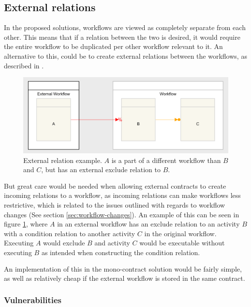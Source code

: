 \documentclass{article}
\begin{document}
		\subsection{External relations}
		\label{sec:external-relations}
		In the proposed solutions, workflows are viewed as completely separate from each other. 
		This means that if a relation between the two is desired, it would require the entire workflow to be duplicated per other workflow relevant to it.
		An alternative to this, could be to create external relations between the workflows, as described in \cite{distributed-workflows}.

		\begin{figure}[!ht]
			\centering
			\includegraphics[scale=0.3]{figures/external-relations-example.png}
		 	\caption[External relation example]
		 	{External relation example. $A$ is a part of a different workflow than $B$ and $C$, but has an external exclude relation to $B$.}
		 	\label{fig:external-relations-example}
		\end{figure}


		But great care would be needed when allowing external contracts to create incoming relations to a workflow, as incoming relations can make workflows less restrictive, which is related to the issues outlined with regards to workflow changes (See section \ref{sec:workflow-changes}). 
		An example of this can be seen in figure \ref{fig:external-relations-example}, where $A$ in an external workflow has an exclude relation to an activity $B$ with a condition relation to another activity $C$ in the original workflow. 
		Executing $A$ would exclude $B$ and activity $C$ would be executable without executing $B$ as intended when constructing the condition relation.

		An implementation of this in the mono-contract solution would be fairly simple, as well as relatively cheap if the external workflow is stored in the same contract.

			\subsubsection{Vulnerabilities}
\end{document}
